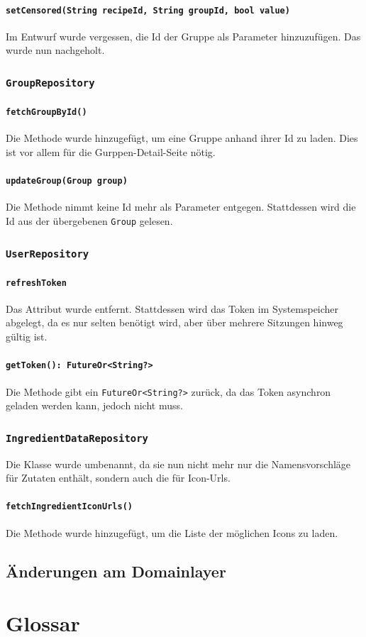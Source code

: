 \documentclass{implementierungsheft}
\begin{document}
\paragraph{\texttt{setCensored(String recipeId, String groupId, bool value)}} Im Entwurf wurde vergessen, die Id der Gruppe als Parameter hinzuzufügen. Das wurde nun nachgeholt.
\subsubsection{\texttt{GroupRepository}}
\paragraph*{\texttt{fetchGroupById()}} Die Methode wurde hinzugefügt, um eine Gruppe anhand ihrer Id zu laden. Dies ist vor allem für die Gurppen-Detail-Seite nötig.
\paragraph*{\texttt{updateGroup(Group group)}} Die Methode nimmt keine Id mehr als Parameter entgegen. Stattdessen wird die Id aus der übergebenen \texttt{Group} gelesen.
\subsubsection{\texttt{UserRepository}}
\paragraph{\texttt{refreshToken}}
Das Attribut wurde entfernt. Stattdessen wird das Token im Systemspeicher abgelegt, da es nur selten benötigt wird, aber über mehrere Sitzungen hinweg gültig ist.
\paragraph{\texttt{getToken(): FutureOr<String?>}} Die Methode gibt ein \texttt{FutureOr<String?>} zurück, da das Token asynchron geladen werden kann, jedoch nicht muss.
\subsubsection{\texttt{IngredientDataRepository}}
Die Klasse wurde umbenannt, da sie nun nicht mehr nur die Namensvorschläge für Zutaten enthält, sondern auch die für Icon-Urls.
\paragraph{\texttt{fetchIngredientIconUrls()}} Die Methode wurde hinzugefügt, um die Liste der möglichen Icons zu laden.
\subsection{Änderungen am Domainlayer}
\section{Glossar}
\printglossary[style=altlist]
\end{document}
